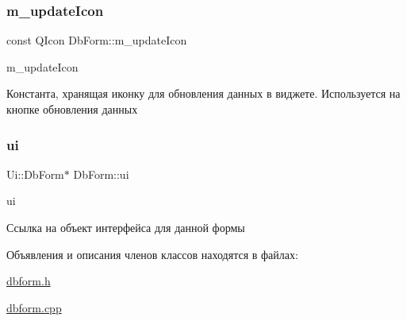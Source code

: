 \subsubsection{\texorpdfstring{m\+\_\+update\+Icon}{m\_updateIcon}}
{\footnotesize\ttfamily const Q\+Icon Db\+Form\+::m\+\_\+update\+Icon\hspace{0.3cm}{\ttfamily [private]}}



m\+\_\+update\+Icon 

Константа, хранящая иконку для обновления данных в виджете. Используется на кнопке обновления данных \mbox{\label{classDbForm_a481b25bcbc8d2613cf09e786319e9559}} 
\subsubsection{\texorpdfstring{ui}{ui}}
{\footnotesize\ttfamily Ui\+::\+Db\+Form$\ast$ Db\+Form\+::ui\hspace{0.3cm}{\ttfamily [private]}}



ui 

Ссылка на объект интерфейса для данной формы 

Объявления и описания членов классов находятся в файлах\+:\begin{DoxyCompactItemize}
\item 
\hyperlink{dbform_8h}{dbform.\+h}\item 
\hyperlink{dbform_8cpp}{dbform.\+cpp}\end{DoxyCompactItemize}
